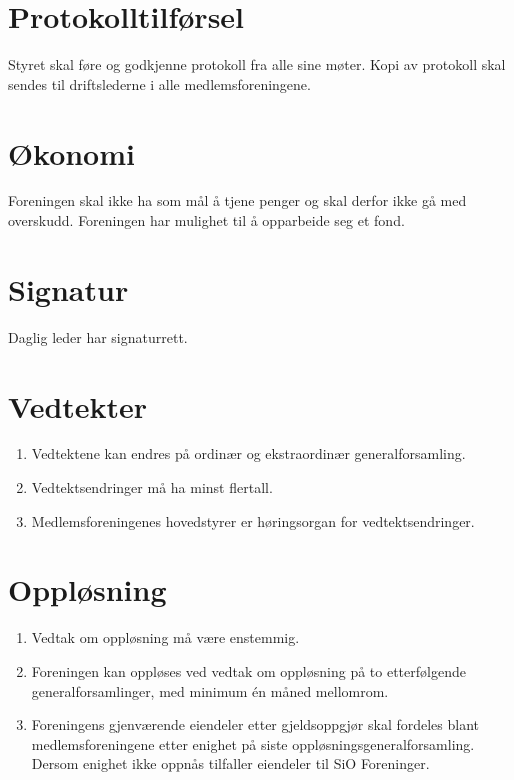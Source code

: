 \documentclass[11pt,norsk,a4paper]{article}
\begin{document}
\section{Protokolltilførsel}
Styret skal føre og godkjenne protokoll fra alle sine møter.
Kopi av protokoll skal sendes til driftslederne i alle medlemsforeningene.


\section{Økonomi}
Foreningen skal ikke ha som mål å tjene penger og skal derfor ikke gå med overskudd.
Foreningen har mulighet til å opparbeide seg et fond.


\section{Signatur}
Daglig leder har signaturrett.


\section{Vedtekter\label{sec:vedtekter}}
\begin{enumerate}
	\item Vedtektene kan endres på ordinær og ekstraordinær generalforsamling.
	\item Vedtektsendringer må ha minst  flertall. 
	\item Medlemsforeningenes hovedstyrer er høringsorgan
		for vedtektsendringer.
\end{enumerate}

\section{Oppløsning\label{sec:opplosing}}
\begin{enumerate}
	\item Vedtak om oppløsning må være enstemmig.
	\item Foreningen kan oppløses ved vedtak om oppløsning på to etterfølgende generalforsamlinger, med minimum én måned mellomrom.
	\item Foreningens gjenværende eiendeler etter gjeldsoppgjør skal fordeles blant medlemsforeningene etter enighet på siste oppløsningsgeneralforsamling. Dersom enighet ikke oppnås tilfaller eiendeler til SiO Foreninger.
\end{enumerate}
\end{document}

